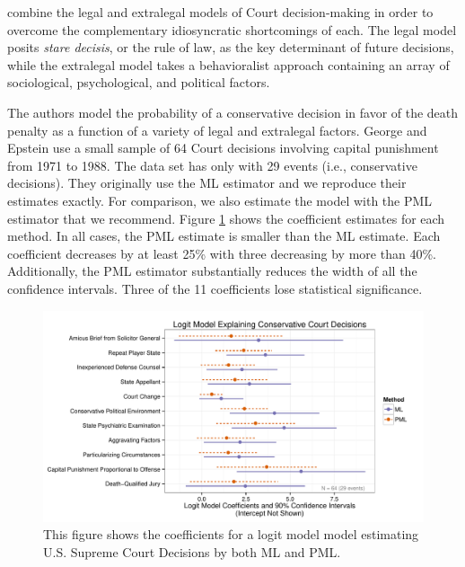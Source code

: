 \documentclass[12pt]{article}
\begin{document}
\cite{GeorgeEpstein1992} combine the legal and extralegal models of Court decision-making in order to overcome the complementary idiosyncratic shortcomings of each.
The legal model posits \emph{stare decisis}, or the rule of law, as the key determinant of future decisions, while the extralegal model takes a behavioralist approach containing an array of sociological, psychological, and political factors.

The authors model the probability of a conservative decision in favor of the death penalty as a function of a variety of legal and extralegal factors. 
George and Epstein use a small sample of 64 Court decisions involving capital punishment from 1971 to 1988. 
The data set has only with 29 events (i.e., conservative decisions).
They originally use the ML estimator and we reproduce their estimates exactly.
For comparison, we also estimate the model with the PML estimator that we recommend.
Figure \ref{fig:ge-coefs} shows the coefficient estimates for each method.
In all cases, the PML estimate is smaller than the ML estimate.
Each coefficient decreases by at least 25\% with three decreasing by more than 40\%.
Additionally, the PML estimator substantially reduces the width of all the confidence intervals.
Three of the 11 coefficients lose statistical significance.

\begin{figure}[h]
\begin{center}
\includegraphics[width = \textwidth]{figs/ge-coefs.pdf}
\caption{This figure shows the coefficients for a logit model model estimating U.S. Supreme Court Decisions by both ML and PML.}\label{fig:ge-coefs}
\end{center}
\end{figure}
\end{document}
